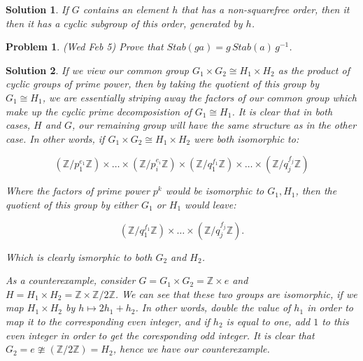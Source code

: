 \documentclass[12pt]{article}
\theoremstyle{moo}
\newtheorem*{prob}{Problem}
\newtheorem*{sol}{Solution}
\def\zz{{\mathbb Z}}
\begin{document}
\begin{sol}
If $G$ contains an element $h$ that has a non-squarefree order, then it then it has a cyclic subgroup of this order, generated by $h$.
\end{sol}



\begin{prob}
(Wed Feb 5) Prove that $Stab(ga)=g\,Stab(a)\,g^{-1}$.
\end{prob}



\begin{sol}
If we view our common group $G_1 \times G_2 \cong H_1 \times H_2$ as the product of cyclic groups of prime power, then by taking the quotient of this group by $G_1\cong H_1$, we are essentially striping away the factors of our common group which make up the cyclic prime decomposistion of $G_1\cong H_1$. It is clear that in both cases, $H$ and $G$, our remaining group will have the same structure as in the other case. In other words, if $G_1 \times G_2 \cong H_1 \times H_2$ were both isomorphic to:

\[
( \zz/p_1^{e_1} \zz ) \times \dots \times ( \zz / p_i^{e_i} \zz ) \times (\zz/ q_1^{f_1} \zz) \times \dots \times (\zz / q_j^{f_j} \zz)
\]

Where the factors of prime power $p^k$ would be isomorphic to $G_1, H_1$, then the quotient of this group by either $G_1$ or  $H_1$ would leave:

\[
(\zz/q_1^{f_1} \zz) \times \dots \times (\zz / q_j^{f_j} \zz).
\]

Which is clearly ismorphic to both $G_2$ and $H_2$.

As a counterexample, consider $G = G_1 \times G_2 = \zz \times {e}$ and $H = H_1 \times H_2 = \zz \times \zz/2\zz$. We can see that these two groups are isomorphic, if we map $H_1 \times H_2 $ by $h \mapsto 2h_1 + h_2$. In other words, double the value of $h_1$ in order to map it to the corresponding even integer, and if $h_2$ is equal to one, add $1$ to this even integer in order to get the coresponding odd integer. It is clear that $G_2 = {e} \ncong (\zz/2\zz) = H_2$, hence we have our counterexample. 
\end{sol}
\end{document}

